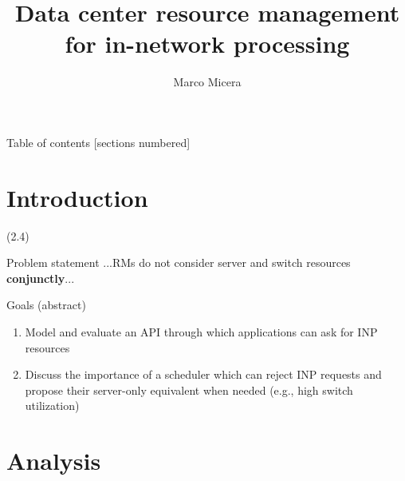 

\title{Data center resource management for in-network processing}
\author{Marco Micera}



\maketitle

\begin{frame}{Table of contents}
  [sections numbered]
  \tableofcontents[hideallsubsections]
\end{frame}

\section{Introduction}

\begin{frame}[fragile]{}
  (2.4)
\end{frame}
\begin{frame}[fragile]{Problem statement}
  ...RMs do not consider server and switch resources \textbf{conjunctly}...
\end{frame}
\begin{frame}[fragile]{Goals}
  (abstract)
  \begin{enumerate}
    \item Model and evaluate an API through which applications can ask for INP resources
    \item Discuss the importance of a scheduler which can reject INP requests and propose their server-only equivalent when needed (e.g., high switch utilization)
  \end{enumerate}
\end{frame}

\section{Analysis}

